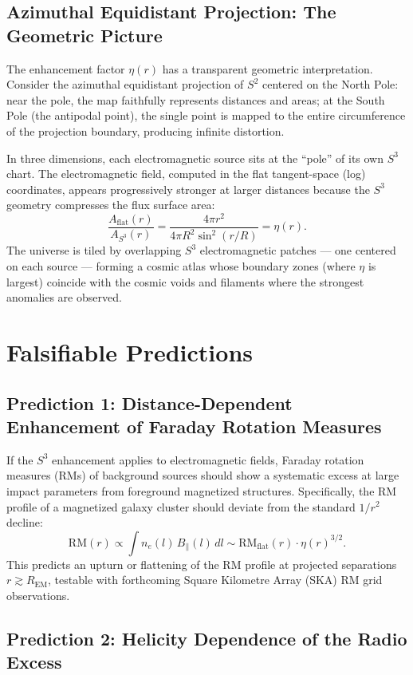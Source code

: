 \documentclass[a4paper]{article}
\begin{document}
\subsection{Azimuthal Equidistant Projection: The Geometric Picture}

The enhancement factor $\eta(r)$ has a transparent geometric interpretation.
Consider the azimuthal equidistant projection of $S^2$ centered on the North
Pole: near the pole, the map faithfully represents distances and areas; at the
South Pole (the antipodal point), the single point is mapped to the entire
circumference of the projection boundary, producing infinite distortion.

In three dimensions, each electromagnetic source sits at the ``pole'' of its own
$S^3$ chart. The electromagnetic field, computed in the flat tangent-space (log)
coordinates, appears progressively stronger at larger distances because the
$S^3$ geometry compresses the flux surface area:
\[
\frac{A_{\text{flat}}(r)}{A_{S^3}(r)} = \frac{4\pi r^2}{4\pi R^2 \sin^2(r/R)} = \eta(r).
\]
The universe is tiled by overlapping $S^3$ electromagnetic patches --- one
centered on each source --- forming a cosmic atlas whose boundary zones (where
$\eta$ is largest) coincide with the cosmic voids and filaments where the
strongest anomalies are observed.

\section{Falsifiable Predictions}
\label{sec:predictions}

\subsection{Prediction 1: Distance-Dependent Enhancement of Faraday Rotation Measures}

If the $S^3$ enhancement applies to electromagnetic fields, Faraday rotation
measures (RMs) of background sources should show a systematic excess at large
impact parameters from foreground magnetized structures. Specifically, the RM
profile of a magnetized galaxy cluster should deviate from the standard $1/r^2$
decline:
\[
\text{RM}(r) \propto \int n_e(l)\, B_\parallel(l)\, dl \sim
\text{RM}_{\text{flat}}(r) \cdot \eta(r)^{3/2}.
\]
This predicts an upturn or flattening of the RM profile at projected separations
$r \gtrsim R_{\text{EM}}$, testable with forthcoming Square Kilometre Array
(SKA) RM grid observations.

\subsection{Prediction 2: Helicity Dependence of the Radio Excess}
\end{document}

